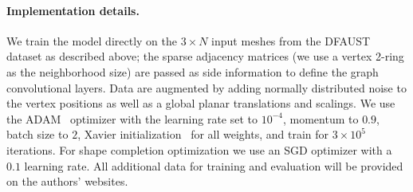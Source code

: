 \paragraph{Implementation details.}
We train the model directly on the $3 \times N$ input meshes from the DFAUST dataset as described above; the sparse adjacency matrices (we use a vertex 2-ring as the neighborhood size) are passed as side information to define the graph convolutional layers. Data are augmented by adding normally distributed noise to the vertex positions as well as a global planar translations and scalings. We use the ADAM~\cite{kingma2014adam} optimizer with the learning rate set to $10^{-4}$, momentum to $0.9$, batch size to $2$, Xavier initialization~\cite{xavierInit} for all weights, and train for $3 \times 10^5$ iterations. For shape completion optimization we use an SGD optimizer with a $0.1$ learning rate. All additional data for training and evaluation will be provided on the authors' websites.
